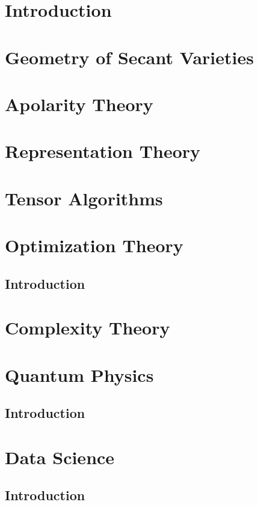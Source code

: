 \documentclass[oneside]{book}
\theoremstyle{plain}
\theoremstyle{definition}
\numberwithin{equation}{subsection}
\begin{document}
\part{Introduction}
\label{part-introduction}


\part{Geometry of Secant Varieties}
\label{part-geometrySecants}


\part{Apolarity Theory}
\label{part-apolarity}


\part{Representation Theory}
\label{part-RepTheory}


\part{Tensor Algorithms}
\label{part-TensorAlgorithms}


\part{Optimization Theory}
\label{part-optimization}

\chapter{Introduction}
\label{optimization-chapter-intro}

\part{Complexity Theory}
\label{part-complexityTheory}


\part{Quantum Physics}
\label{part-quantumph}

\chapter{Introduction}
\label{quantumph-chapter-intro}

\part{Data Science}
\label{part-datascience}

\chapter{Introduction}
\label{datascience-chapter-intro}



\end{document}
